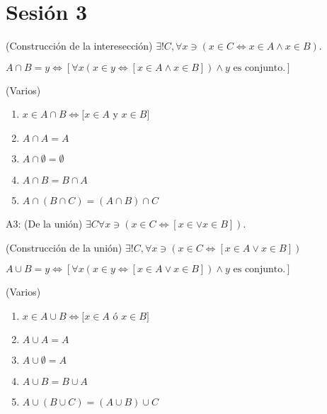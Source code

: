 \section{Sesión 3}

\begin{teorema}(Construcción de la interesección)
	$\exists ! C, \forall x\ni (x\in C\iff x\in A\wedge x\in B)$.
\end{teorema}
\begin{definicion}
	$A\cap B = y\iff \left[\forall x(x\in y\iff [x\in A\wedge x\in B])\wedge y \text{ es conjunto.}\right]$
\end{definicion}

\begin{teorema}(Varios)
	\begin{enumerate}
		\item $x \in A \cap B \Leftrightarrow[x \in A$ y $x \in B]$
		\item$A \cap A=A$
		\item $A \cap \emptyset=\emptyset$
		\item $A \cap B=B \cap A$
		\item $A \cap(B \cap C)=(A \cap B) \cap C$
	\end{enumerate}
\end{teorema}
\begin{cajita}
	A3: (De la unión) $\exists C\forall x\ni (x\in C\iff [x\in \vee x\in B])$.
\end{cajita}
\begin{teorema}(Construcción de la unión)
	$\exists ! C, \forall x \ni (x\in C\iff [x\in A \vee x\in B])$
\end{teorema}

\begin{definicion}
	$A\cup B = y\iff \left[\forall x(x\in y\iff [x\in A\vee x\in B])\wedge y \text{ es conjunto.}\right]$
\end{definicion}

\begin{teorema}(Varios)
	\begin{enumerate}
		\item $x \in A \cup B \Leftrightarrow[x \in A$ ó $x \in B]$
		\item $A \cup A=A$
		\item $A \cup \emptyset=A$
		\item $A \cup B=B \cup A$
		\item $A \cup(B \cup C)=(A \cup B) \cup C$
	\end{enumerate}
\end{teorema}

